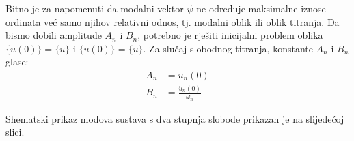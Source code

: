 Bitno je za napomenuti da modalni vektor $\psi$ ne određuje maksimalne iznose
ordinata već samo njihov relativni odnos, tj. modalni oblik ili oblik titranja. Da
bismo dobili amplitude $A_n$ i $B_n$, potrebno je rješiti inicijalni problem oblika 
$\{u(0)\} = \{u\}$ i $\{\dot{u}(0)\}=\{\dot{u}\}$. Za slučaj slobodnog titranja,
konstante $A_n$ i $B_n$ glase:
\begin{align}
    A_n&=u_n(0)\\
    B_n&=\frac{\dot{u}_n(0)}{\omega_n}
\end{align}

Shematski prikaz modova sustava s dva stupnja slobode prikazan je na slijedećoj
slici.
